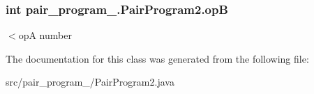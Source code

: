 \subsubsection[{\texorpdfstring{opB}{opB}}]{\setlength{\rightskip}{0pt plus 5cm}int pair\+\_\+program\+\_.\+Pair\+Program2.\+opB\hspace{0.3cm}{\ttfamily [static]}}\hypertarget{classpair__program__2_1_1_pair_program2_a213dcf08e0608ddf9677e6fff25e121b}{}\label{classpair__program__2_1_1_pair_program2_a213dcf08e0608ddf9677e6fff25e121b}
$<$opA number 

The documentation for this class was generated from the following file\+:\begin{DoxyCompactItemize}
\item 
src/pair\+\_\+program\+\_/Pair\+Program2.\+java\end{DoxyCompactItemize}

